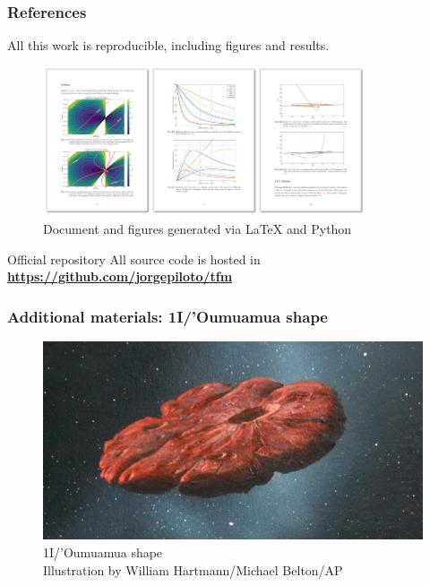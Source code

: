 \documentclass[xcolor={dvipsnames}]{beamer}
\begin{document}
\begin{frame}
\frametitle{References}

All this work is reproducible, including figures and results.

\vspace{0.15cm}
\begin{figure}[h]
    \centering
    \includegraphics[width=0.85\textwidth]{fig/static/thumbnails.png}
        \caption{Document and figures generated via LaTeX and Python}
    \label{fig:oumuamua-shape}
\end{figure}

\vspace{-0.20cm}
\begin{alertblock}{Official repository}
\vspace{0.1cm}
All source code is hosted in \textbf{\href{https://github.com/jorgepiloto/tfm}{https://github.com/jorgepiloto/tfm}}
\vspace{0.1cm}
\end{alertblock}

\end{frame}

\begin{frame}
\frametitle{Additional materials: 1I/'Oumuamua shape}

\begin{figure}[h]
    \centering
    \includegraphics[width=\textwidth]{fig/static/oumuamua-shape.png}
        \caption{1I/'Oumuamua shape\\\tiny{Illustration by William Hartmann/Michael Belton/AP}}
    \label{fig:oumuamua-shape}
\end{figure}

\end{frame}
\end{document}
